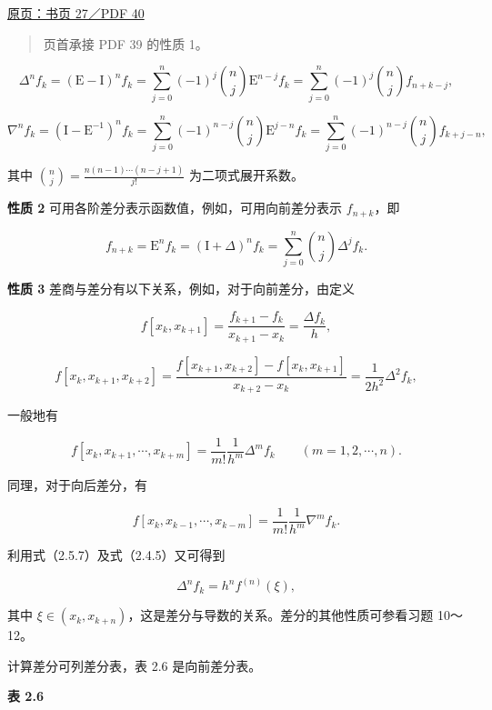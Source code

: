 \href{source-images/pdf-040.jpeg}{原页：书页 27／PDF 40}

\begin{quote}
页首承接 PDF 39 的性质 1。
\end{quote}

\[
\Delta^n f_k=(\mathrm{E}-\mathrm{I})^n f_k
=\sum_{j=0}^{n}(-1)^j\binom{n}{j}\mathrm{E}^{n-j}f_k
=\sum_{j=0}^{n}(-1)^j\binom{n}{j}f_{n+k-j},
\tag{2.5.4}
\]

\[
\nabla^n f_k=(\mathrm{I}-\mathrm{E}^{-1})^n f_k
=\sum_{j=0}^{n}(-1)^{n-j}\binom{n}{j}\mathrm{E}^{j-n}f_k
=\sum_{j=0}^{n}(-1)^{n-j}\binom{n}{j}f_{k+j-n},
\tag{2.5.5}
\]

其中 \(\displaystyle\binom{n}{j}=\frac{n(n-1)\cdots(n-j+1)}{j!}\) 为二项式展开系数。

\textbf{性质 2} 可用各阶差分表示函数值，例如，可用向前差分表示 \(f_{n+k}\)，即

\[
f_{n+k}=\mathrm{E}^n f_k=(\mathrm{I}+\Delta)^n f_k=\sum_{j=0}^{n}\binom{n}{j}\Delta^j f_k.
\tag{2.5.6}
\]

\textbf{性质 3} 差商与差分有以下关系，例如，对于向前差分，由定义

\[
f[x_k,x_{k+1}]=\frac{f_{k+1}-f_k}{x_{k+1}-x_k}=\frac{\Delta f_k}{h},
\]

\[
f[x_k,x_{k+1},x_{k+2}]=\frac{f[x_{k+1},x_{k+2}]-f[x_k,x_{k+1}]}{x_{k+2}-x_k}=\frac{1}{2h^2}\Delta^2 f_k,
\]

一般地有

\[
f[x_k,x_{k+1},\cdots,x_{k+m}]=\frac{1}{m!}\frac{1}{h^m}\Delta^m f_k\qquad(m=1,2,\cdots,n).
\tag{2.5.7}
\]

同理，对于向后差分，有

\[
f[x_k,x_{k-1},\cdots,x_{k-m}]=\frac{1}{m!}\frac{1}{h^m}\nabla^m f_k.
\tag{2.5.8}
\]

利用式（2.5.7）及式（2.4.5）又可得到

\[
\Delta^n f_k=h^n f^{(n)}(\xi),
\tag{2.5.9}
\]

其中 \(\xi\in(x_k,x_{k+n})\)，这是差分与导数的关系。差分的其他性质可参看习题 10～12。

计算差分可列差分表，表 2.6 是向前差分表。

\textbf{表 2.6}

